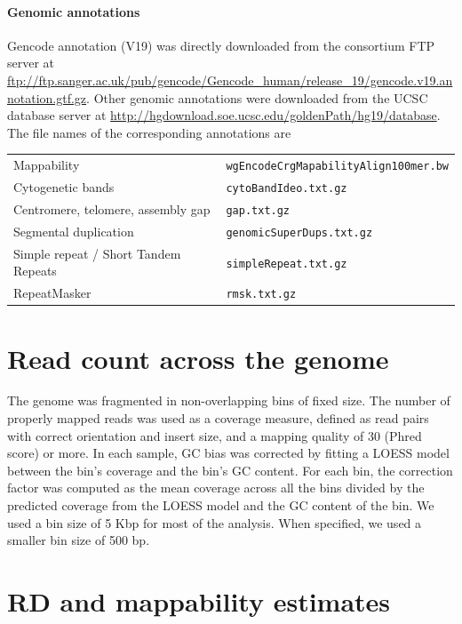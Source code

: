 \paragraph{Genomic annotations} Gencode annotation (V19) was directly downloaded from the consortium FTP server at \url{ftp://ftp.sanger.ac.uk/pub/gencode/Gencode_human/release_19/gencode.v19.annotation.gtf.gz}.
Other genomic annotations were downloaded from the UCSC database\cite{Rosenbloom2015} server at \url{http://hgdownload.soe.ucsc.edu/goldenPath/hg19/database}.
The file names of the corresponding annotations are
\label{sec:genodata}

\medskip

\begin{tabular}{|l|l|}
  \hline
  Mappability                          & \verb!wgEncodeCrgMapabilityAlign100mer.bw! \\
  Cytogenetic bands                    & \verb!cytoBandIdeo.txt.gz!                 \\
  Centromere, telomere, assembly gap   & \verb!gap.txt.gz!                          \\
  Segmental duplication                & \verb!genomicSuperDups.txt.gz!             \\
  Simple repeat / Short Tandem Repeats & \verb!simpleRepeat.txt.gz!                 \\
  RepeatMasker                         & \verb!rmsk.txt.gz!                         \\
  \hline
\end{tabular}

\section*{Read count across the genome}

The genome was fragmented in non-overlapping bins of fixed size.
The number of properly mapped reads was used as a coverage measure, defined as read pairs with correct orientation and insert size, and a mapping quality of 30 (Phred score) or more.
In each sample, GC bias was corrected by fitting a LOESS model between the bin's coverage and the bin's GC content.
For each bin, the correction factor was computed as the mean coverage across all the bins divided by the predicted coverage from the LOESS model and the GC content of the bin.
We used a bin size of 5 Kbp for most of the analysis.
When specified, we used a smaller bin size of 500 bp.

\section*{RD and mappability estimates}

